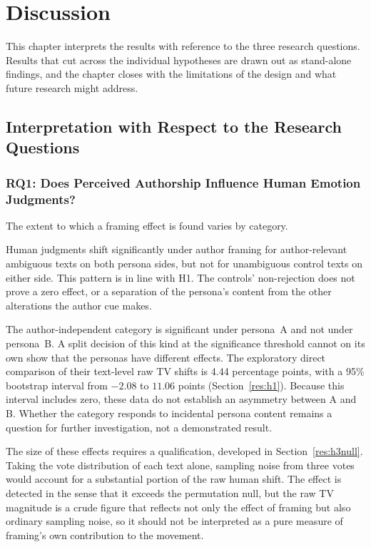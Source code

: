 \chapter{Discussion}
\label{c:discussion}

\noindent
This chapter interprets the results with reference to the three research questions. Results that
cut across the individual hypotheses are drawn out as stand-alone findings, and the chapter closes
with the limitations of the design and what future research might address.

\section{Interpretation with Respect to the Research Questions}
\label{disc:rqs}

\subsection{RQ1: Does Perceived Authorship Influence Human Emotion Judgments?}
\label{disc:rq1}

\noindent
The extent to which a framing effect is found varies by category.

Human judgments shift significantly under author framing for author-relevant ambiguous texts on
both persona sides, but not for unambiguous control texts on either side. This pattern is in line
with H1. The controls' non-rejection does not prove a zero effect, or a separation of the
persona's content from the other alterations the author cue makes.

The author-independent category is significant under persona~A and not under persona~B. A split
decision of this kind at the significance threshold cannot on its own show that the personas have different effects.
The exploratory direct comparison of their text-level raw TV shifts is 4.44 percentage points,
with a 95\% bootstrap interval from $-2.08$ to $11.06$ points (Section~\ref{res:h1}). Because this
interval includes zero, these data do not establish an asymmetry between A and B. Whether the
category responds to incidental persona content remains a question for further investigation, not a
demonstrated result.

The size of these effects requires a qualification, developed in Section~\ref{res:h3null}. Taking
the vote distribution of each text alone, sampling noise from three votes would account for a
substantial portion of the raw human shift. The effect is detected in the sense that it exceeds
the permutation null, but the raw TV magnitude is a crude figure that reflects not only the effect
of framing but also ordinary sampling noise, so it should not be interpreted as a pure measure of
framing's own contribution to the movement.

